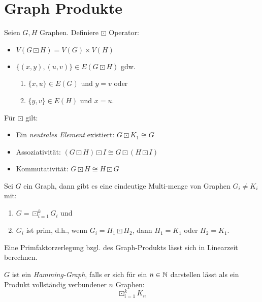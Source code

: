 \chapter{Graph Produkte}

\begin{definition}[Produkt]
    Seien $ G, H $ Graphen.
    Definiere $ \boxdot $ Operator:
    \begin{itemize}
        \item $ V(G \boxdot H) = V(G) \times V(H) $
        \item $ \{ (x, y), (u, v) \} \in E(G \boxdot H) $ gdw. \begin{enumerate}
            \item $ \{ x, u \} \in E(G) $ und $ y = v $ oder
            \item $ \{ y, v \} \in E(H) $ und $ x = u $.
        \end{enumerate}
    \end{itemize}
\end{definition}

\begin{proposition}
    Für $ \boxdot $ gilt:
    \begin{itemize}
        \item Ein \textit{neutrales Element} existiert: $ G \boxdot K_1 \cong G $
        \item Assoziativität: $ (G \boxdot H) \boxdot I \cong G \boxdot (H \boxdot I) $
        \item Kommutativität: $ G \boxdot H \cong H \boxdot G $
    \end{itemize}
\end{proposition}

\begin{theorem}
    Sei $ G $ ein Graph, dann gibt es eine eindeutige Multi-menge von Graphen $ G_i \neq K_i $ mit:
    \begin{enumerate}
        \item $ G = \boxdot^k_{i = 1} G_i $ und
        \item $ G_i $ ist prim, d.h., wenn $ G_i = H_1 \boxdot H_2 $, dann $ H_1 = K_1 $ oder $ H_2 = K_1 $.
    \end{enumerate}
\end{theorem}

\begin{remark}
    Eine Primfaktorzerlegung bzgl. des Graph-Produkts lässt sich in Linearzeit berechnen.
\end{remark}

\begin{definition}
    $ G $ ist ein \textit{Hamming-Graph}, falls er sich für ein $ n \in \mathbb{N} $ darstellen lässt als ein Produkt vollständig verbundener $ n $ Graphen:
    \begin{equation*}
        \boxdot^k_{i = 1} K_n
    \end{equation*}
\end{definition}

